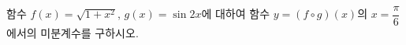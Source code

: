 함수 $f(x)=\sqrt{1+x^2}$, $g(x)=\sin 2x$에 대하여 함수 $y=(f\circ g)(x)$의 $x=\dfrac{\pi}{6}$에서의 미분계수를 구하시오.
